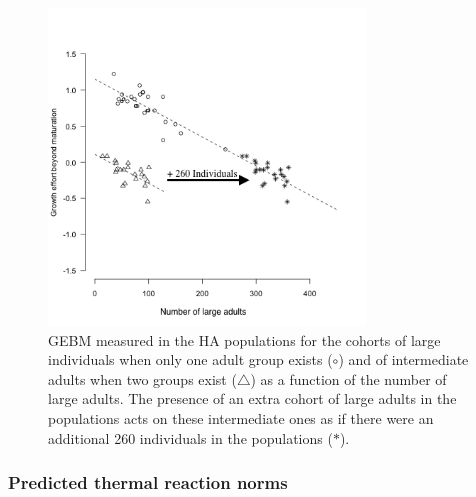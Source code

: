 \begin{figure}[!ht]
\begin{center}
\includegraphics[width=0.75\textwidth]{1_CorpsDeThese/Resumes/Fig/FIP06}
\caption[GEBM in populations of clone
HA at $21\degres$C]{GEBM measured in the HA populations for the cohorts of large
individuals when only one adult group exists ($\circ$) and of intermediate
adults when two groups exist ($\triangle$) as a function of the number of large
adults.
The presence of an extra cohort of large adults in the populations acts on these intermediate
ones as if there were an additional 260 individuals in the populations
($\ast$).}
\label{fig:AnFIP6}
\end{center}
\end{figure}

\subsubsection{Predicted thermal reaction norms}

